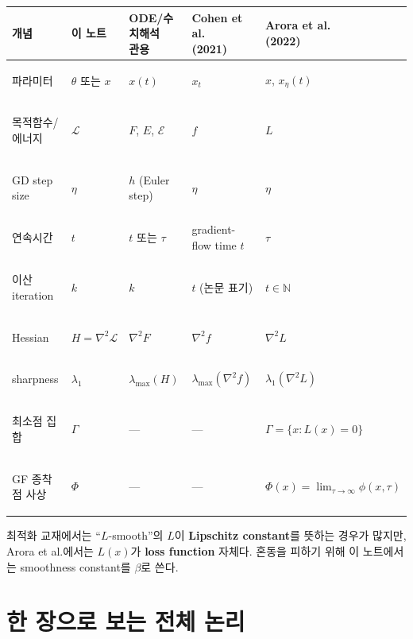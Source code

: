 \documentclass[11pt,a4paper,oneside,openany]{memoir}
\newcommand{\Loss}{\mathcal{L}}
\newcommand{\Hess}{\nabla^2}
\newcommand{\lmax}{\lambda_{\max}}
\theoremstyle{definition}
\begin{document}
\begin{center}
\small
\begin{tabularx}{\textwidth}{>{\bfseries\raggedright\arraybackslash}p{} *{4}{>{\raggedright\arraybackslash}X}}
\toprule
개념 & 이 노트 & \makecell[l]{ODE/수치해석\\관용} & \makecell[l]{Cohen et al.\\(2021)} & \makecell[l]{Arora et al.\\(2022)} \\
\midrule
파라미터 & $\theta$ 또는 $x$ & $x(t)$ & $x_t$ & $x$, $x_\eta(t)$ \\
목적함수/에너지 & $\Loss$ & $F$, $E$, $\mathcal E$ & $f$ & $L$ \\
GD step size & $\eta$ & $h$ (Euler step) & $\eta$ & $\eta$ \\
연속시간 & $t$ & $t$ 또는 $\tau$ & gradient-flow time $t$ & $\tau$ \\
이산 iteration & $k$ & $k$ & $t$ (논문 표기) & $t\in\mathbb N$ \\
Hessian & $H=\Hess\Loss$ & $\Hess F$ & $\Hess f$ & $\Hess L$ \\
sharpness & $\lambda_1$ & $\lmax(H)$ & $\lmax(\Hess f)$ & $\lambda_1(\Hess L)$ \\
최소점 집합 & $\Gamma$ & --- & --- & $\Gamma=\{x:L(x)=0\}$ \\
GF 종착점 사상 & $\Phi$ & --- & --- & $\Phi(x)=\lim_{\tau\to\infty}\phi(x,\tau)$ \\
\bottomrule
\end{tabularx}
\end{center}

\begin{warningbox}[--- 특히 $L$의 중복 사용]
최적화 교재에서는 ``$L$-smooth''의 $L$이 \textbf{Lipschitz constant}를 뜻하는 경우가 많지만,
Arora et al.에서는 $L(x)$가 \textbf{loss function} 자체다. 혼동을 피하기 위해 이 노트에서는
smoothness constant를 $\beta$로 쓴다.
\end{warningbox}

\section{한 장으로 보는 전체 논리}
\end{document}
